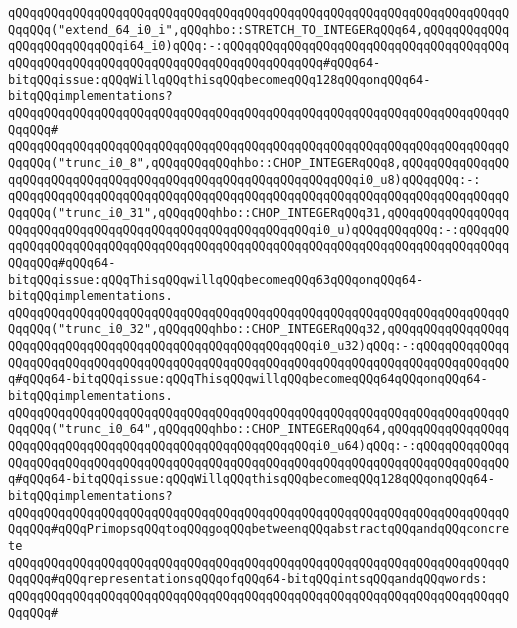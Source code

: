 \verb|qQQqqQQqqQQqqQQqqQQqqQQqqQQqqQQqqQQqqQQqqQQqqQQqqQQqqQQqqQQqqQQqqQQqqQQqqQQq("extend_64_i0_i",qQQqhbo::STRETCH_TO_INTEGERqQQq64,qQQqqQQqqQQqqQQqqQQqqQQqqQQqi64_i0)qQQq:-:qQQqqQQqqQQqqQQqqQQqqQQqqQQqqQQqqQQqqQQqqQQqqQQqqQQqqQQqqQQqqQQqqQQqqQQqqQQqqQQqqQQq#qQQq64-bitqQQqissue:qQQqWillqQQqthisqQQqbecomeqQQq128qQQqonqQQq64-bitqQQqimplementations?|\newline
\verb|qQQqqQQqqQQqqQQqqQQqqQQqqQQqqQQqqQQqqQQqqQQqqQQqqQQqqQQqqQQqqQQqqQQqqQQqqQQq#|\newline
\verb|qQQqqQQqqQQqqQQqqQQqqQQqqQQqqQQqqQQqqQQqqQQqqQQqqQQqqQQqqQQqqQQqqQQqqQQqqQQq("trunc_i0_8",qQQqqQQqqQQqhbo::CHOP_INTEGERqQQq8,qQQqqQQqqQQqqQQqqQQqqQQqqQQqqQQqqQQqqQQqqQQqqQQqqQQqqQQqqQQqqQQqi0_u8)qQQqqQQq:-:|\newline
\verb|qQQqqQQqqQQqqQQqqQQqqQQqqQQqqQQqqQQqqQQqqQQqqQQqqQQqqQQqqQQqqQQqqQQqqQQqqQQq("trunc_i0_31",qQQqqQQqhbo::CHOP_INTEGERqQQq31,qQQqqQQqqQQqqQQqqQQqqQQqqQQqqQQqqQQqqQQqqQQqqQQqqQQqqQQqqQQqi0_u)qQQqqQQqqQQq:-:qQQqqQQqqQQqqQQqqQQqqQQqqQQqqQQqqQQqqQQqqQQqqQQqqQQqqQQqqQQqqQQqqQQqqQQqqQQqqQQqqQQq#qQQq64-bitqQQqissue:qQQqThisqQQqwillqQQqbecomeqQQq63qQQqonqQQq64-bitqQQqimplementations.|\newline
\verb|qQQqqQQqqQQqqQQqqQQqqQQqqQQqqQQqqQQqqQQqqQQqqQQqqQQqqQQqqQQqqQQqqQQqqQQqqQQq("trunc_i0_32",qQQqqQQqhbo::CHOP_INTEGERqQQq32,qQQqqQQqqQQqqQQqqQQqqQQqqQQqqQQqqQQqqQQqqQQqqQQqqQQqqQQqqQQqi0_u32)qQQq:-:qQQqqQQqqQQqqQQqqQQqqQQqqQQqqQQqqQQqqQQqqQQqqQQqqQQqqQQqqQQqqQQqqQQqqQQqqQQqqQQqqQQq#qQQq64-bitqQQqissue:qQQqThisqQQqwillqQQqbecomeqQQq64qQQqonqQQq64-bitqQQqimplementations.|\newline
\verb|qQQqqQQqqQQqqQQqqQQqqQQqqQQqqQQqqQQqqQQqqQQqqQQqqQQqqQQqqQQqqQQqqQQqqQQqqQQq("trunc_i0_64",qQQqqQQqhbo::CHOP_INTEGERqQQq64,qQQqqQQqqQQqqQQqqQQqqQQqqQQqqQQqqQQqqQQqqQQqqQQqqQQqqQQqqQQqi0_u64)qQQq:-:qQQqqQQqqQQqqQQqqQQqqQQqqQQqqQQqqQQqqQQqqQQqqQQqqQQqqQQqqQQqqQQqqQQqqQQqqQQqqQQqqQQq#qQQq64-bitqQQqissue:qQQqWillqQQqthisqQQqbecomeqQQq128qQQqonqQQq64-bitqQQqimplementations?|\newline
\newline
\verb|qQQqqQQqqQQqqQQqqQQqqQQqqQQqqQQqqQQqqQQqqQQqqQQqqQQqqQQqqQQqqQQqqQQqqQQqqQQq#qQQqPrimopsqQQqtoqQQqgoqQQqbetweenqQQqabstractqQQqandqQQqconcrete|\newline
\verb|qQQqqQQqqQQqqQQqqQQqqQQqqQQqqQQqqQQqqQQqqQQqqQQqqQQqqQQqqQQqqQQqqQQqqQQqqQQq#qQQqrepresentationsqQQqofqQQq64-bitqQQqintsqQQqandqQQqwords:|\newline
\verb|qQQqqQQqqQQqqQQqqQQqqQQqqQQqqQQqqQQqqQQqqQQqqQQqqQQqqQQqqQQqqQQqqQQqqQQqqQQq#|\newline
